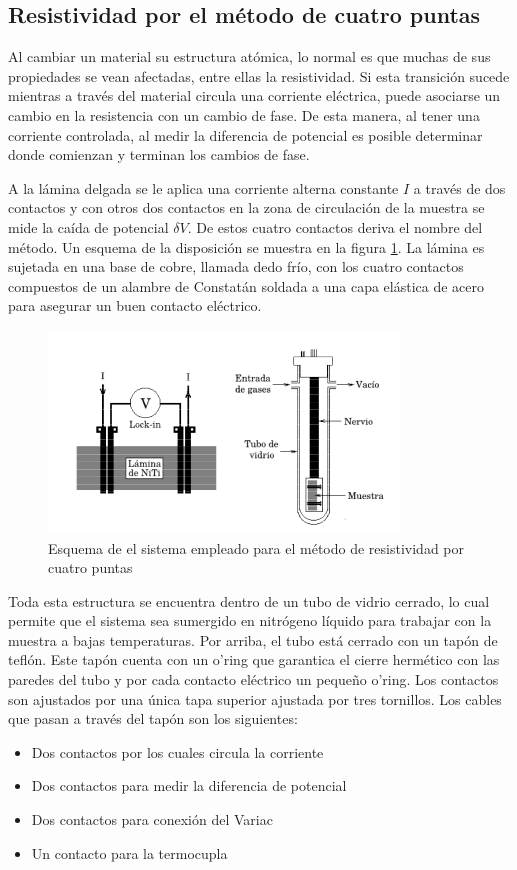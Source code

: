 \documentclass{article}
\theoremstyle{definition}
\theoremstyle{remark}
\begin{document}
\subsection{Resistividad por el método de cuatro puntas}
Al cambiar un material su estructura atómica, lo normal es que muchas de sus propiedades se vean afectadas, entre ellas la resistividad. Si esta transición sucede mientras a través del material circula una corriente eléctrica, puede asociarse un cambio en la resistencia con un cambio de fase. De esta manera, al tener una corriente controlada, al medir la diferencia de potencial es posible determinar donde comienzan y terminan los cambios de fase.

A la lámina delgada se le aplica una corriente alterna constante $I$ a través de dos contactos y con otros dos contactos en la zona de circulación de la muestra se mide la caída de potencial $\delta V$. De estos cuatro contactos deriva el nombre del método. Un esquema de la disposición se muestra en la figura \ref{4puntas}. La lámina es sujetada en una base de cobre, llamada dedo frío, con los cuatro contactos compuestos de un alambre de Constatán soldada a una capa elástica de acero para asegurar un buen contacto eléctrico.

 \begin{figure}[H]
 	\centering
	\includegraphics[scale=0.5]{img/r4puntas.png}
 	\caption{Esquema de el sistema empleado para el método de resistividad por  cuatro puntas}
	\label{4puntas}
\end{figure} 

Toda esta estructura se encuentra dentro de un tubo de vidrio cerrado, lo cual permite que el sistema sea sumergido en nitrógeno líquido para trabajar con la muestra a bajas temperaturas. Por arriba, el tubo está cerrado con un tapón de teflón. Este tapón cuenta con un o'ring que garantica el cierre hermético con las paredes del tubo y por cada contacto eléctrico un pequeño o'ring. Los contactos son ajustados por una única tapa superior ajustada por tres tornillos. Los cables que pasan a través del tapón son los siguientes:
\begin{itemize}
\item Dos contactos por los cuales circula la corriente 
\item Dos contactos para medir la diferencia de potencial
\item Dos contactos para conexión del Variac
\item Un contacto para la termocupla
\end{itemize}
\end{document}
